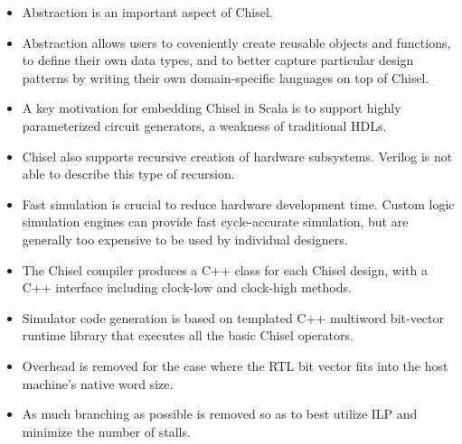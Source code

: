 \documentclass{beamer}
\begin{document}
\begin{frame}
\begin{itemize}

\item Abstraction is an important aspect of Chisel.

\item Abstraction allows users to coveniently create reusable objects and functions, to define their own data types, and to better capture particular design patterns by writing their own domain-specific languages on top of Chisel.

\end{itemize}
\end{frame}

\begin{frame}
\begin{itemize}

\item A key motivation for embedding Chisel in Scala is to support highly parameterized circuit generators, a weakness of traditional HDLs.

\item Chisel also supports recursive creation of hardware subsystems. Verilog is not able to describe this type of recursion.

\end{itemize}
\end{frame}

\begin{frame}
\begin{itemize}

\item Fast simulation is crucial to reduce hardware development time. Custom logic simulation engines can provide fast cycle-accurate simulation, but are generally too expensive to be used by individual designers.

\item The Chisel compiler produces a C++ class for each Chisel design, with a C++ interface including clock-low and clock-high methods.

\item Simulator code generation is based on templated C++ multiword bit-vector runtime library that executes all the basic Chisel operators.

\item Overhead is removed for the case where the RTL bit vector fits into the host machine's native word size.

\item As much branching as possible is removed so as to best utilize ILP and minimize the number of stalls.

\end{itemize}
\end{frame}
\end{document}
